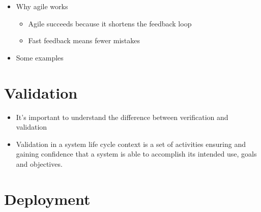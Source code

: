 \documentclass{report}
\begin{document}
\begin{itemize}
\begin{enumerate}
				\item Working software is the primary measure of progress
				\item Maintain sustainable development
				\item Pursue technical excellence
				\item Keep solutions simple
			\end{enumerate}
			\begin{itemize}
				\item \textbf{Key Agile Values}
					\begin{itemize}
						\item Individuals and interactions over processes and tools
						\item Working software over comprehensive documentation
						\item Customer collaboration over contract negotiation
						\item Responding to change over following a plan
					\end{itemize}
				\item Successful Agile teams commonly use
					\begin{itemize}
						\item User stories
						\item Test driven development
					\end{itemize}
			\end{itemize}
		\item Why agile works
			\begin{itemize}
				\item Agile succeeds because it shortens the feedback loop
				\item Fast feedback means fewer mistakes
			\end{itemize}
		\item Some examples
	\end{itemize}

	\section{Validation}

		\begin{itemize}
			\item It's important to understand the difference between verification and validation
			\item Validation in a system life cycle context is a set of activities ensuring and gaining confidence that a system is able to accomplish its intended use, goals and objectives.
		\end{itemize}
	
	\section{Deployment}
\end{document}
